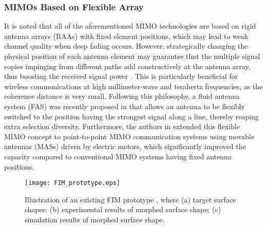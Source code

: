 \documentclass[lettersize,journal]{IEEEtran}
\begin{document}
\subsubsection{MIMOs Based on Flexible Array}
It is noted that all of the aforementioned MIMO technologies are based on rigid antenna arrays (RAAs) with fixed element positions, which may lead to weak channel quality when deep fading occurs. However, strategically changing the physical position of each antenna element may guarantee that the multiple signal copies impinging from different paths add constructively at the antenna array, thus boosting the received signal power \cite{BOOK_2005_Tse_Fundamentals}. This is particularly beneficial for wireless communications at high millimeter-wave and terahertz frequencies, as the coherence distance is very small. Following this philosophy, a fluid antenna system (FAS) was recently proposed in \cite{TWC_2022_Wong_Fluid} that allows an antenna to be flexibly switched to the position having the strongest signal along a line, thereby reaping extra selection diversity. Furthermore, the authors in \cite{TWC_2023_Ma_MIMO} extended this flexible MIMO concept to point-to-point MIMO communication systems using movable antennas (MASs) driven by electric motors, which significantly improved the capacity compared to conventional MIMO systems having fixed antenna positions.
\begin{figure}[!t]
\centering
\texttt{[image: FIM\_prototype.eps]}
\caption{Illustration of an existing FIM prototype \cite{Nature_2022_Bai_A}, where (a) target surface shapes; (b) experimental results of morphed surface shape; (c) simulation results of morphed surface shape.}\vspace{-0.5cm}
\label{fig_1}
\end{figure}
\end{document}
